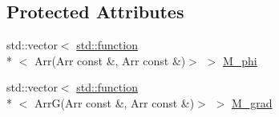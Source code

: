 \subsection*{Protected Attributes}
\begin{DoxyCompactItemize}
\item 
std\-::vector$<$ \hyperlink{vtk__vector__out_8m_a6235d6cebbf2f77ca6dbae2811d86530}{std\-::function}\\*
$<$ Arr(Arr const \&, Arr const \&)$>$ $>$ \hyperlink{classTspeed_1_1ShapeFunction_a6d8010d0c9d5e40f21f57c8201149ad5}{M\-\_\-phi}
\item 
std\-::vector$<$ \hyperlink{vtk__vector__out_8m_a6235d6cebbf2f77ca6dbae2811d86530}{std\-::function}\\*
$<$ Arr\-G(Arr const \&, Arr const \&)$>$ $>$ \hyperlink{classTspeed_1_1ShapeFunction_a282cf4ac589829f07a6c24e443d7bd05}{M\-\_\-grad}
\end{DoxyCompactItemize}



